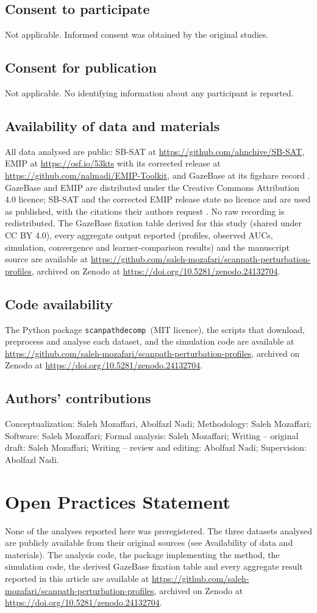 \documentclass[man,floatsintext,12pt]{apa7}
\newcommand{\pkg}{\texttt{scanpathdecomp}}
\newcommand{\repository}{\url{https://github.com/saleh-mozafari/scanpath-perturbation-profiles}, archived on Zenodo at \url{https://doi.org/10.5281/zenodo.24132704}}
\begin{document}
\subsection*{Consent to participate}
Not applicable. Informed consent was obtained by the original studies.

\subsection*{Consent for publication}
Not applicable. No identifying information about any participant is reported.

\subsection*{Availability of data and materials}
All data analysed are public: SB-SAT at \url{https://github.com/ahnchive/SB-SAT}, EMIP at \url{https://osf.io/53kts} with its corrected release at \url{https://github.com/nalmadi/EMIP-Toolkit}, and GazeBase at its figshare record \citep{griffith2021gazebase}. GazeBase and EMIP are distributed under the Creative Commons Attribution 4.0 licence; SB-SAT and the corrected EMIP release state no licence and are used as published, with the citations their authors request \citep{ahn2020towards, almadi2021emiptoolkit}. No raw recording is redistributed. The GazeBase fixation table derived for this study (shared under CC BY 4.0), every aggregate output reported (profiles, observed AUCs, simulation, convergence and learner-comparison results) and the manuscript source are available at \repository.

\subsection*{Code availability}
The Python package \pkg\ (MIT licence), the scripts that download, preprocess and analyse each dataset, and the simulation code are available at \repository.

\subsection*{Authors' contributions}
Conceptualization: Saleh Mozaffari, Abolfazl Nadi; Methodology: Saleh Mozaffari; Software: Saleh Mozaffari; Formal analysis: Saleh Mozaffari; Writing -- original draft: Saleh Mozaffari; Writing -- review and editing: Abolfazl Nadi; Supervision: Abolfazl Nadi.

\section*{Open Practices Statement}
None of the analyses reported here was preregistered. The three datasets analysed are publicly available from their original sources (see Availability of data and materials). The analysis code, the package implementing the method, the simulation code, the derived GazeBase fixation table and every aggregate result reported in this article are available at \repository.

\printbibliography
\end{document}
